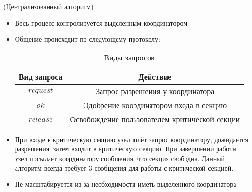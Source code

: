 \begin{algorithm}(Централизованный алгоритм)
    \begin{itemize}
        \item Весь процесс контролируется выделенным координатором
        \item Общение происходит по следующему протоколу:
            \begin{table}[!ht]
                \centering
                \begin{tabular}{|c|c|} \hline
                    Вид запроса & Действие \\ \hline
                    $request$ & Запрос разрешения у координатора \\ \hline
                    $ok$ & Одобрение координатором входа в секцию \\ \hline
                    $release$ & Освобождение пользователем критической секции \\ \hline
                \end{tabular}
                \caption{Виды запросов}
            \end{table}
        \item При входе в критическую секцию узел шлёт запрос координатору, дожидается разрешения, затем входит в критическую секцию.
            При завершении работы узел посылает координатору сообщения, что секция свободна. Данный алгоритм всегда требует 3 сообщения для работы с критической секцией.
        \item Не масштабируется из-за необходимости иметь выделенного координатора
    \end{itemize}
\end{algorithm}

